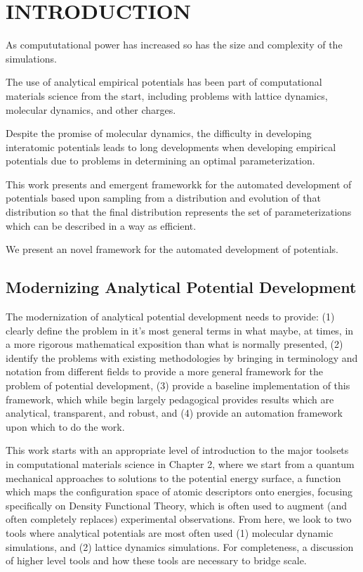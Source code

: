 \chapter{INTRODUCTION}\label{intro}

As compututational power has increased so has the size and complexity of the simulations.

The use of analytical empirical potentials has been part of computational materials science from the start, including problems with lattice dynamics, molecular dynamics, and other charges.

Despite the promise of molecular dynamics, the difficulty in developing interatomic potentials leads to long developments when developing empirical potentials due to problems in determining an optimal parameterization.

This work presents and emergent frameworkk for the automated development of potentials based upon sampling from a distribution and evolution of that distribution so that the final distribution represents the set of parameterizations which can be described in a way as efficient.

We present an novel framework for the automated development of potentials.
\section{}
\section{Modernizing Analytical Potential Development}

The modernization of analytical potential development needs to provide: (1) clearly define the problem in it's most general terms in what maybe, at times, in a more rigorous mathematical exposition than what is normally presented, (2) identify the problems with existing methodologies by bringing in terminology and notation from different fields to provide a more general framework for the problem of potential development, (3) provide a baseline implementation of this framework, which while begin largely pedagogical provides results which are analytical, transparent, and robust, and (4) provide an automation framework upon which to do the work.

This work starts with an appropriate level of introduction to the major toolsets in computational materials science in Chapter 2, where we start from a quantum mechanical approaches to solutions to the potential energy surface, a function which maps the configuration space of atomic descriptors onto energies, focusing specifically on Density Functional Theory, which is often used to augment (and often completely replaces) experimental observations.  From here, we look to two tools where analytical potentials are most often used (1) molecular dynamic simulations, and (2) lattice dynamics simulations.  For completeness, a discussion of higher level tools and how these tools are necessary to bridge scale.

